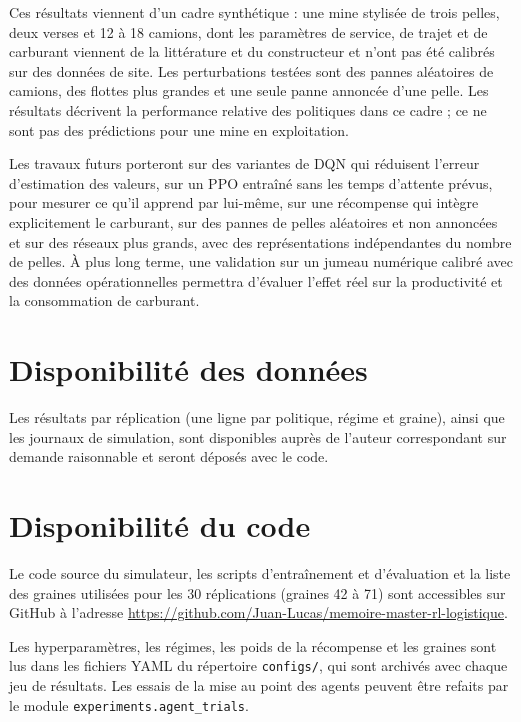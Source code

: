 \documentclass[11pt,a4paper]{article}
\newif\ifrevmarks
\newcommand{\revtag}[1]{\ifrevmarks\textsuperscript{\textcolor{red!70!black}{\scriptsize[#1]}}\fi}
\newcommand{\rev}[2]{\ifrevmarks{\color{revcolor}#2}\revtag{#1}\else#2\fi}
\newenvironment{revbloc}[1]{\par\ifrevmarks\color{revcolor}\noindent\revtag{#1}\ \fi}{\par}
\newif\ifcorrmarks
\newcommand{\corr}[1]{\ifcorrmarks\textcolor{corrcolor}{#1}\else#1\fi}
\begin{document}
\begin{revbloc}{T31}
\corr{Ces résultats viennent d'un cadre synthétique : une mine stylisée de trois pelles, deux verses et 12 à 18 camions, dont les paramètres de service, de trajet et de carburant viennent de la littérature et du constructeur et n'ont pas été calibrés sur des données de site. Les perturbations testées sont des pannes aléatoires de camions, des flottes plus grandes et une seule panne annoncée d'une pelle. Les résultats décrivent la performance relative des politiques dans ce cadre ; ce ne sont pas des prédictions pour une mine en exploitation.}

Les travaux futurs porteront sur des variantes de DQN qui réduisent l'erreur d'estimation des valeurs, \corr{sur un PPO entraîné sans les temps d'attente prévus, pour mesurer ce qu'il apprend par lui-même,} sur une récompense qui intègre explicitement le carburant, \corr{sur des pannes de pelles aléatoires et non annoncées} et sur des réseaux plus grands, avec des représentations indépendantes du nombre de pelles. À plus long terme, une validation sur un jumeau numérique calibré avec des données opérationnelles permettra d'évaluer l'effet réel sur la productivité et la consommation de carburant.
\end{revbloc}

\newpage

\section*{Disponibilité des données}

\rev{M3}{Les résultats par réplication (une ligne par politique, régime et graine), ainsi que les journaux de simulation, sont disponibles auprès de l'auteur correspondant sur demande raisonnable et seront déposés avec le code.}

\section*{Disponibilité du code}

Le code source du simulateur, les scripts d'entraînement et d'évaluation et la liste des graines utilisées pour les 30 réplications (graines 42 à 71) sont accessibles sur GitHub à l'adresse \url{https://github.com/Juan-Lucas/memoire-master-rl-logistique}.

\rev{T28, v3}{Les hyperparamètres, les régimes, les poids de la récompense et les graines sont lus dans les fichiers YAML du répertoire \texttt{configs/}, qui sont archivés avec chaque jeu de résultats. Les essais de la mise au point des agents peuvent être refaits par le module \texttt{experiments.agent\_trials}.}
\end{document}
